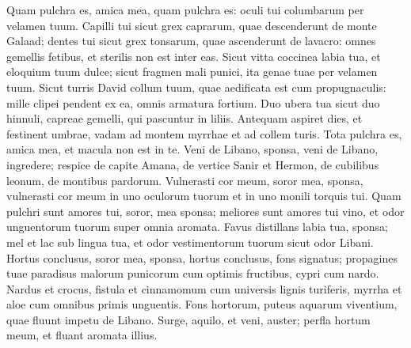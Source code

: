 \begin{biblechapter}  
\verse Quam pulchra es, amica mea, quam pulchra es: oculi tui columbarum per velamen tuum. Capilli tui sicut grex caprarum, quae descenderunt de monte Galaad; 
\verse dentes tui sicut grex tonsarum, quae ascenderunt de lavacro: omnes gemellis fetibus, et sterilis non est inter eas. 
\verse Sicut vitta coccinea labia tua, et eloquium tuum dulce; sicut fragmen mali punici, ita genae tuae per velamen tuum. 
\verse Sicut turris David collum tuum, quae aedificata est cum propugnaculis: mille clipei pendent ex ea, omnis armatura fortium. 
\verse Duo ubera tua sicut duo hinnuli, capreae gemelli, qui pascuntur in liliis. 
\verse Antequam aspiret dies, et festinent umbrae, vadam ad montem myrrhae et ad collem turis. 
\verse Tota pulchra es, amica mea, et macula non est in te. 
\verse Veni de Libano, sponsa, veni de Libano, ingredere; respice de capite Amana, de vertice Sanir et Hermon, de cubilibus leonum, de montibus pardorum. 
\verse Vulnerasti cor meum, soror mea, sponsa, vulnerasti cor meum in uno oculorum tuorum et in uno monili torquis tui. 
\verse Quam pulchri sunt amores tui, soror, mea sponsa; meliores sunt amores tui vino, et odor unguentorum tuorum super omnia aromata. 
\verse Favus distillans labia tua, sponsa; mel et lac sub lingua tua, et odor vestimentorum tuorum sicut odor Libani. 
\verse Hortus conclusus, soror mea, sponsa, hortus conclusus, fons signatus; 
\verse propagines tuae paradisus malorum punicorum cum optimis fructibus, cypri cum nardo. 
\verse Nardus et crocus, fistula et cinnamomum cum universis lignis turiferis, myrrha et aloe cum omnibus primis unguentis. 
\verse Fons hortorum, puteus aquarum viventium, quae fluunt impetu de Libano. 
\verse Surge, aquilo, et veni, auster; perfla hortum meum, et fluant aromata illius. 
\end{biblechapter}

